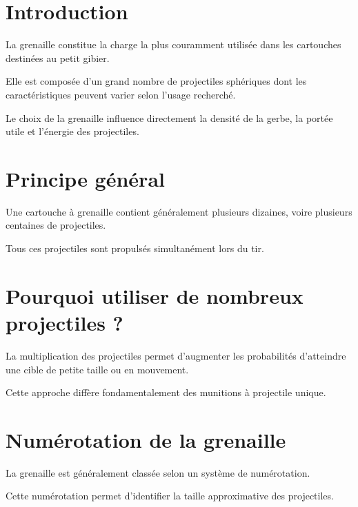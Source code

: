 
\section{Introduction}

La grenaille constitue la charge la plus couramment utilisée dans les cartouches
destinées au petit gibier.

Elle est composée d'un grand nombre de projectiles sphériques dont les
caractéristiques peuvent varier selon l'usage recherché.

\begin{aretenir}

Le choix de la grenaille influence directement la densité de la gerbe,
la portée utile et l'énergie des projectiles.

\end{aretenir}

\section{Principe général}

Une cartouche à grenaille contient généralement plusieurs dizaines, voire
plusieurs centaines de projectiles.

Tous ces projectiles sont propulsés simultanément lors du tir.

\section{Pourquoi utiliser de nombreux projectiles ?}

La multiplication des projectiles permet d'augmenter les probabilités
d'atteindre une cible de petite taille ou en mouvement.

Cette approche diffère fondamentalement des munitions à projectile unique.

\section{Numérotation de la grenaille}

La grenaille est généralement classée selon un système de numérotation.

Cette numérotation permet d'identifier la taille approximative des projectiles.

